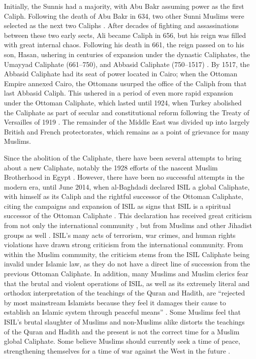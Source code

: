 \documentclass{report}
\begin{document}
Initially, the Sunnis had a majority, with Abu Bakr assuming power as the first Caliph. Following the death of Abu Bakr in 634, two other Sunni Muslims were selected as the next two Caliphs \cite{schmidt2004great}. After decades of fighting and assassinations between these two early sects, Ali became Caliph in 656, but his reign was filled with great internal chaos. Following his death in 661, the reign passed on to his son, Hasan, ushering in centuries of expansion under the dynastic Caliphates, the Umayyad Caliphate (661–750), and Abbasid Caliphate (750–1517) \cite{schmidt2004great,oliver2009caliphate}. By 1517, the Abbasid Caliphate had its seat of power located in Cairo; when the Ottoman Empire annexed Cairo, the Ottomans usurped the office of the Caliph from that last Abbasid Caliph. This ushered in a period of even more rapid expansion under  the Ottoman Caliphate, which lasted until 1924, when Turkey abolished the Caliphate as part of secular and constitutional reform following the Treaty of Versailles of 1919 \cite{schmidt2004great,ozoglu2011caliphate}. The remainder of the Middle East was divided up into largely British and French protectorates, which remains as a point of grievance for many Muslims.
    
    Since the abolition of the Caliphate, there have been several attempts to bring about a new Caliphate, notably the  1928 efforts of the nascent Muslim Brotherhood in Egypt \cite{Tolson2008,gabriel2008they}. However, there have been no successful attempts in the modern era, until  June 2014, when al-Baghdadi declared ISIL a global Caliphate, with himself as its Caliph and the rightful successor of the Ottoman Caliphate, citing the campaigns and expansion of ISIL as signs that ISIL is a spiritual successor of the Ottoman Caliphate \cite{Mortada2014,TheWeek2014}.  This declaration has received great criticism from not only the international community \cite{Gomes2007}, but from Muslims and other Jihadist groups as well \cite{Mandhai2014,Moore2014}. ISIL's many acts of terrorism, war crimes, and human rights violations have drawn strong criticism from the international community. From within the Muslim community, the criticism stems from the ISIL Caliphate being invalid under Islamic law, as they do not have a direct line of succession from the previous Ottoman Caliphate. In addition, many Muslims and Muslim clerics fear that the brutal and violent operations of ISIL, as well as its extremely literal and orthodox interpretation of the teachings of  the Quran and Hadith, are \enquote{rejected by most mainstream Islamists because they feel it damages their cause to establish an Islamic system through peaceful means} \cite{Mandhai2014}. Some Muslims feel that ISIL's brutal slaughter of Muslims and non-Muslims alike distorts the teachings of the Quran and Hadith and the present is not the correct time for a Muslim global Caliphate. Some believe Muslims  should currently seek a time of peace, strengthening themselves for a time of war against the West in the future \cite{schmidt2004great,Moore2014,Wood2015}.
\end{document}

